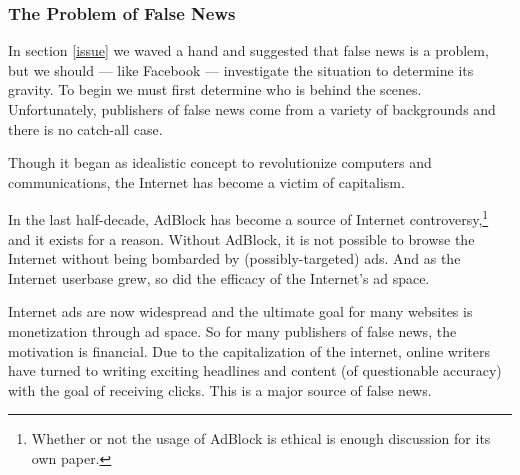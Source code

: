 
\subsubsection{The Problem of False News}\label{fn_intent}

\par In section \ref{issue} we waved a hand and suggested that false news is a problem, but we should --- like Facebook --- investigate the situation to determine its gravity. To begin we must first determine who is behind the scenes. Unfortunately, publishers of false news come from a variety of backgrounds and there is no catch-all case. \cite{cbs_fn}


\par Though it began as idealistic concept to revolutionize computers and communications, \cite{internet} the Internet has become a victim of capitalism.
\par In the last half-decade, AdBlock has become a source of Internet controversy,\footnote{Whether or not the usage of AdBlock is ethical is enough discussion for its own paper.} and it exists for a reason. \cite{bbc_adblock} Without AdBlock, it is not possible to browse the Internet without being bombarded by (possibly-targeted) ads. And as the Internet userbase grew, so did the efficacy of the Internet's ad space.
\par Internet ads are now widespread and the ultimate goal for many websites is monetization through ad space. \cite{bbc_clickbait} So for many publishers of false news, the motivation is financial. Due to the capitalization of the internet, online writers have turned to writing exciting headlines and content (of questionable accuracy) with the goal of receiving clicks. This is a major source of false news. \cite{tc_ban}


